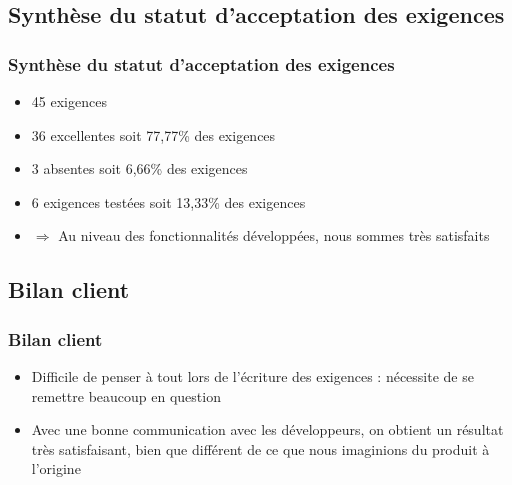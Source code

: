 \documentclass{beamer}
\begin{document}
    \subsection{Synthèse du statut d'acceptation des exigences}
    \begin{frame}
      \frametitle{Synthèse du statut d'acceptation des exigences}
      \begin{block}{}
        \begin{itemize}
          \item 45 exigences
          \item 36 excellentes soit 77,77\% des exigences
          \item 3 absentes soit 6,66\% des exigences
          \item 6 exigences testées soit 13,33\% des exigences
          \item $ \Rightarrow $ Au niveau des fonctionnalités développées, nous sommes très satisfaits
        \end{itemize}
      \end{block}
    \end{frame}
    
    \subsection{Bilan client}
    \begin{frame}
      \frametitle{Bilan client}
      \begin{block}{}
        \begin{itemize}
          \item Difficile de penser à tout lors de l'écriture des exigences : nécessite de se remettre beaucoup en question
          \item Avec une bonne communication avec les développeurs, on obtient un résultat très satisfaisant, bien que différent de ce que nous imaginions du produit à l'origine
        \end{itemize}
      \end{block}
    \end{frame}
\end{document}
